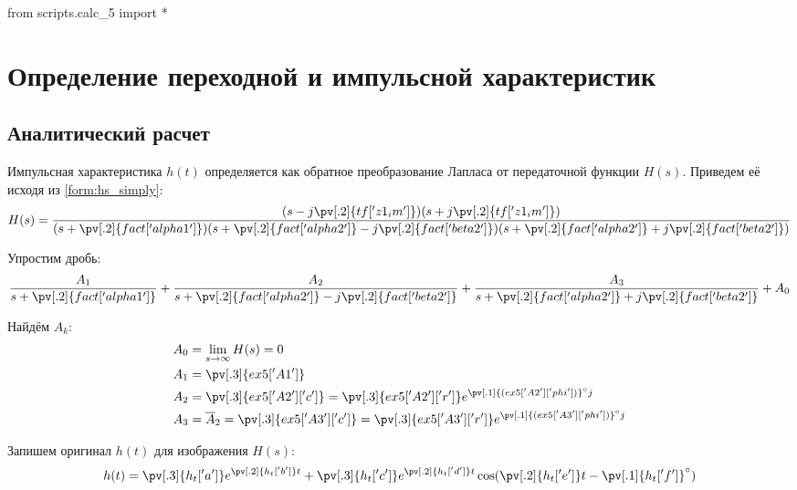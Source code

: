\begin{python}
from scripts.calc_5 import *
\end{python}

\section{Определение переходной и импульсной характеристик}

\subsection{Аналитический расчет}

Импульсная характеристика $h(t)$ определяется как обратное преобразование Лапласа от передаточной функции $H(s)$. Приведем её исходя из \cref{form:hs_simply}:
\begin{equation}
    H(s) = \frac{
        (s - j\pv[.2]{tf['z1_im']})
        (s + j\pv[.2]{tf['z1_im']})
    }{
        (s + \pv[.2]{fact['alpha1']})
        (s + \pv[.2]{fact['alpha2']} - j\pv[.2]{fact['beta2']})
        (s + \pv[.2]{fact['alpha2']} + j\pv[.2]{fact['beta2']})
    }
\end{equation}

Упростим дробь:
\begin{equation}
    \frac{A_1}{s + \pv[.2]{fact['alpha1']}} +
    \frac{A_2}{s + \pv[.2]{fact['alpha2']} - j\pv[.2]{fact['beta2']}} +
    \frac{A_3}{s + \pv[.2]{fact['alpha2']} + j\pv[.2]{fact['beta2']}} +
    A_0
\end{equation}

Найдём $A_k$:
\begin{equation}
    \begin{aligned}
        A_0 &= \lim_{s\to\infty} H(s) = 0 \\
        A_1 &= \pv[.3]{ex5['A1']} \\
        A_2 &= \pv[.3]{ex5['A2']['c']} = \pv[.3]{ex5['A2']['r']} e^{\pv[.1]{(ex5['A2']['phi'])}^\circ j} \\
        A_3 &= \overline{A}_2 = \pv[.3]{ex5['A3']['c']} = \pv[.3]{ex5['A3']['r']} e^{\pv[.1]{(ex5['A3']['phi'])}^\circ j}
        \label{form:vichetiAk}
    \end{aligned}
\end{equation}

Запишем оригинал $h(t)$ для изображения $H(s)$:
\begin{equation}
    h(t) =
    \pv[.3]{h_t['a']} e^{\pv[.2]{h_t['b']} t} +
    \pv[.3]{h_t['c']} e^{\pv[.2]{h_t['d']} t}
    \cos(\pv[.2]{h_t['e']} t - \pv[.1]{h_t['f']}^\circ)
\end{equation}

